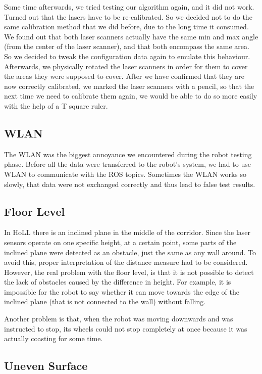 Some time afterwards, we tried testing our algorithm again, and it did not work. Turned out that the lasers have to be re-calibrated. So we decided not to do the same calibration method that we did before, due to the long time it consumed. We found out that both laser scanners actually have the same min and max angle (from the center of the laser scanner), and that both encompass the same area. So we decided to tweak the configuration data again to emulate this behaviour. Afterwards, we physically rotated the laser scanners in order for them to cover the areas they were supposed to cover. After we have confirmed that they are now correctly calibrated, we marked the laser scanners with a pencil, so that the next time we need to calibrate them again, we would be able to do so more easily with the help of a T square ruler. 

\subsection{WLAN}

The WLAN was the biggest annoyance we encountered during the robot testing phase. Before all the data were transferred to the robot's system, we had to use WLAN to communicate with the ROS topics. Sometimes the WLAN works so slowly, that data were not exchanged correctly and thus lead to false test results.

\subsection{Floor Level}

In HoLL there is an inclined plane in the middle of the corridor. Since the laser sensors operate on one specific height, at a certain point, some parts of the inclined plane were detected as an obstacle, just the same as any wall around. To avoid this, proper interpretation of the distance measure had to be considered. However, the real problem with the floor level, is that it is not possible to detect the lack of obstacles caused by the difference in height. For example, it is impossible for the robot to say whether it can move towards the edge of the inclined plane (that is not connected to the wall) without falling.

Another problem is that, when the robot was moving downwards and was instructed to stop, its wheels could not stop completely at once because it was actually coasting for some time.

\subsection{Uneven Surface}

